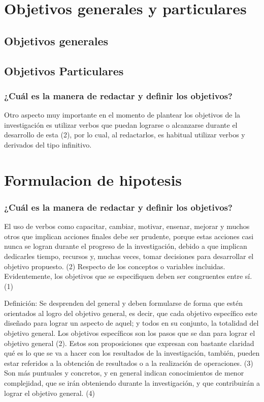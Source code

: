 \documentclass{beamer}
\begin{document}
			\section{Objetivos generales y particulares}
			\subsection{Objetivos generales}
				\subsection{Objetivos Particulares}
			\begin{frame}
				\frametitle{¿Cuál es la manera de redactar y definir los objetivos?}
				\begin{definition}
					Otro aspecto muy importante en el momento de plantear los objetivos de la investigación es utilizar verbos que puedan lograrse o alcanzarse durante el desarrollo de esta (2), por lo cual, al redactarlos, es habitual utilizar verbos y derivados del tipo infinitivo.
				\end{definition}
			\end{frame}
			\section{Formulacion de hipotesis}
			
			\begin{frame}
				\frametitle{¿Cuál es la manera de redactar y definir los objetivos?}
				\begin{definition}
					El uso de verbos como capacitar, cambiar, motivar, ensenar, mejorar y muchos otros que implican acciones finales debe ser prudente, porque estas acciones casi nunca se logran durante el progreso de la investigación, debido a que implican dedicarles tiempo, recursos y, muchas veces, tomar decisiones para desarrollar el objetivo propuesto. (2)
					Respecto de los conceptos o variables incluidas. Evidentemente, los objetivos que se especifiquen deben ser congruentes entre sí. (1)					
				\end{definition}
			\end{frame}
			
	\begin{frame}
	 \begin{definition}
	 Definición: Se desprenden del general y deben formularse de forma que estén orientados al logro del objetivo general, es decir, que cada objetivo específico este diseñado para lograr un aspecto de aquel; y todos en su conjunto, la totalidad del objetivo general. Los objetivos específicos son los pasos que se dan para lograr el objetivo general (2). 
	 Estos son proposiciones que expresan con bastante claridad qué es lo que se va a hacer con los resultados de la investigación, también, pueden estar referidos a la obtención de resultados o a la realización de operaciones. (3) Son más puntuales y concretos, y en general indican conocimientos de menor complejidad, que se irán obteniendo durante la investigación, y que contribuirán a lograr el objetivo general. (4)
	\end{definition}
\end{frame}
\end{document}

